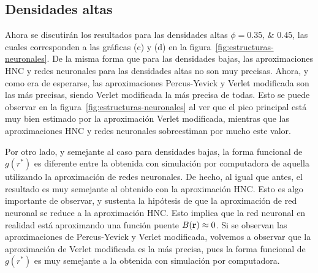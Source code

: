 \subsection{Densidades altas}
Ahora se discutirán los resultados para las densidades altas $\phi=\numlist{0.35; 0.45}$,
las cuales corresponden a las gráficas (c) y (d) en la figura~\ref{fig:estructuras-neuronales}.
De la misma forma que para las densidades bajas, las aproximaciones HNC y redes neuronales
para las densidades altas no son muy precisas. Ahora, y como era de esperarse, las 
aproximaciones Percus-Yevick y Verlet modificada son las más precisas, siendo Verlet
modificada la más precisa de todas. Esto se puede observar en la figura~\ref{fig:estructuras-neuronales}
al ver que el pico principal está muy bien estimado por la aproximación Verlet modificada,
mientras que las aproximaciones HNC y redes neuronales sobreestiman por mucho este valor.

Por otro lado, y semejante al caso para densidades bajas, la forma funcional de $g(r^*)$
es diferente entre la obtenida con simulación por computadora de aquella utilizando la
aproximación de redes neuronales. De hecho, al igual que antes, el resultado es muy
semejante al obtenido con la aproximación HNC. Esto es algo importante de observar, y
sustenta la hipótesis de que la aproximación de red neuronal se reduce a la aproximación
HNC.
Esto implica que la red neuronal en realidad está aproximando una función puente
$B(\mathbf{r}) \approx 0$.
Si se observan las aproximaciones de Percus-Yevick y Verlet modificada, volvemos a observar
que la aproximación de Verlet modificada es la más precisa, pues la forma funcional de
$g(r^*)$ es muy semejante a la obtenida con simulación por computadora.
